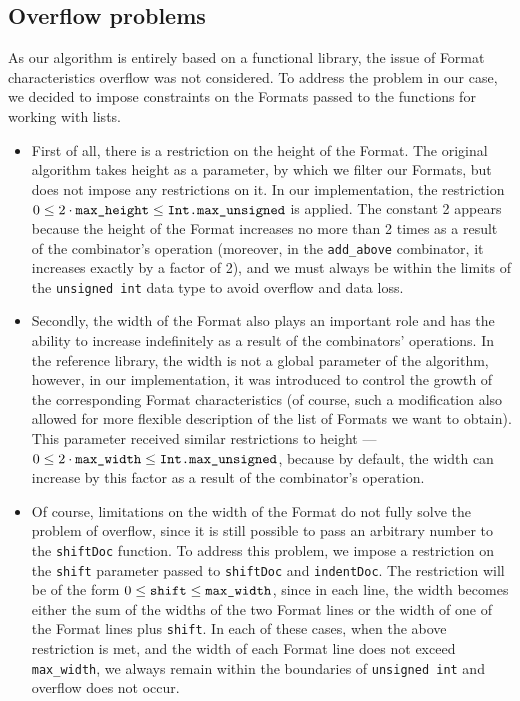 \documentclass[14pt]{constructor-diploma}
\begin{document}
\subsection{Overflow problems}
As our algorithm is entirely based on a functional library, the issue of Format characteristics overflow was not considered. 
To address the problem in our case, we decided to impose constraints on the Formats passed to the functions for working with lists.
\begin{itemize}
  \item First of all, there is a restriction on the height of the Format. 
  The original algorithm takes height as a parameter, by which we filter our Formats, but does not impose any restrictions on it. 
  In our implementation, the restriction $0 \le 2 \cdot \text{\texttt{max\_height}} \le \text{\texttt{Int.max\_unsigned}}$ is applied. 
  The constant 2 appears because the height of the Format increases no more than 2 times as a result of the combinator's operation
  (moreover, in the \texttt{add\_above} combinator, it increases exactly by a factor of 2), 
  and we must always be within the limits of the \texttt{unsigned int} data type to avoid overflow and data loss.
  \item Secondly, the width of the Format also plays an important role and has the ability to increase indefinitely as a result of the combinators' operations. 
  In the reference library, the width is not a global parameter of the algorithm, however, in our implementation, it was introduced to control the growth of the corresponding Format characteristics 
  (of course, such a modification also allowed for more flexible description of the list of Formats we want to obtain). 
  This parameter received similar restrictions to height --- $0 \le 2 \cdot \text{\texttt{max\_width}} \le \text{\texttt{Int.max\_unsigned}}$, because by default, 
  the width can increase by this factor as a result of the combinator's operation.
  \item Of course, limitations on the width of the Format do not fully solve the problem of overflow, since it is still possible to pass an arbitrary number to the \texttt{shiftDoc} function. 
  To address this problem, we impose a restriction on the \texttt{shift} parameter passed to \texttt{shiftDoc} and \texttt{indentDoc}. 
  The restriction will be of the form $0 \le \text{\texttt{shift}} \le \text{\texttt{max\_width}}$, since in each line, the width becomes either the sum of the widths of the two Format lines or the width of one of the Format lines plus \texttt{shift}. 
  In each of these cases, when the above restriction is met, and the width of each Format line does not exceed \texttt{max\_width}, we always remain within the boundaries of \texttt{unsigned int} and overflow does not occur.
\end{itemize}
\end{document}
